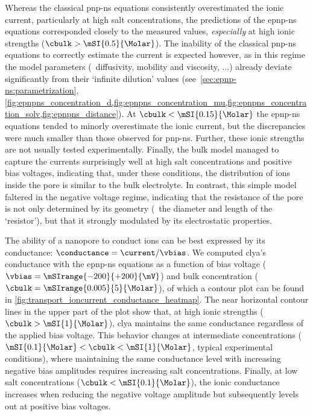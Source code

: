 Whereas the classical \gls{pnp-ns} equations consistently overestimated the ionic current, particularly at
high salt concentrations, the predictions of the \gls{epnp-ns} equations corresponded closely to the measured
values, \emph{especially} at high ionic strengths ($\cbulk > \mSI{0.5}{\Molar}$). The inability of the
classical \gls{pnp-ns} equations to correctly estimate the current is expected however, as in this regime the
model parameters (\eg~diffusivity, mobility and viscosity, ...) already deviate significantly from their
`infinite dilution' values (see~\cref{sec:epnp-ns:parametrization},
\cref{fig:epnpns_concentration_d,fig:epnpns_concentration_mu,fig:epnpns_concentration_solv,fig:epnpns_distance}).
At $\cbulk < \mSI{0.15}{\Molar}$ the \gls{epnp-ns} equations tended to minorly overestimate the ionic current,
but the discrepancies were much smaller than those observed for \gls{pnp-ns}. Further, these ionic strengths
are not usually tested experimentally. Finally, the bulk model managed to capture the currents surprisingly
well at high salt concentrations and positive bias voltages, indicating that, under these conditions, the
distribution of ions inside the pore is similar to the bulk electrolyte. In contrast, this simple model
faltered in the negative voltage regime, indicating that the resistance of the pore is not only determined by
its geometry (\ie~the diameter and length of the `resistor'), but that it strongly modulated by its
electrostatic properties.

The ability of a nanopore to conduct ions can be best expressed by its conductance: $\conductance = \current /
\vbias$. We computed \gls{clya}'s conductance with the \gls{epnp-ns} equations as a function of bias voltage
($\vbias = \mSIrange{-200}{+200}{\mV}$) and bulk  concentration ($\cbulk =
\mSIrange{0.005}{5}{\Molar}$), of which a contour plot can be found in
\cref{fig:transport_ioncurrent_conductance_heatmap}. The near horizontal contour lines in the upper part of
the plot show that, at high ionic strengths ($\cbulk > \mSI{1}{\Molar}$), \gls{clya} maintains the same
conductance regardless of the applied bias voltage. This behavior changes at intermediate concentrations
($\mSI{0.1}{\Molar} < \cbulk < \mSI{1}{\Molar}$, typical experimental conditions), where maintaining the same
conductance level with increasing negative bias amplitudes requires increasing salt concentrations. Finally,
at low salt concentrations ($\cbulk < \mSI{0.1}{\Molar}$), the ionic conductance increases when reducing the
negative voltage amplitude but subsequently levels out at positive bias voltages.

